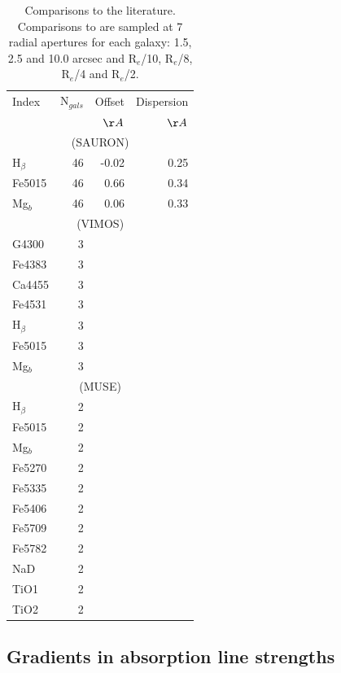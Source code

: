 	\begin{table}
		\centering
		\caption{Comparisons to the literature. Comparisons to \citet{Rampazzo2005} are sampled at 7 radial apertures for each galaxy: 1.5, 2.5 and 10.0 arcsec and R$_e$/10, R$_e$/8, R$_e$/4 and R$_e$/2.}
		\label{tab:litAbsorption}
		\begin{tabular}{l r r r}
			\hline
			\hline
			Index 		& N$_{gals}$ & Offset 	& Dispersion \\
						& 			& $\AA$		& $\AA$ \\
			\hline
			\multicolumn{4}{c}{\citet{Vazdekis2010} (SAURON)} \\
			\hline
			H$_\beta$ 	& 46		& -0.02		& 0.25	\\
			Fe5015		& 46		& 0.66		& 0.34	\\
			Mg$_b$ 		& 46		& 0.06		& 0.33	\\
			\hline
			\multicolumn{4}{c}{\citet{Rampazzo2005} (VIMOS)} \\
			\hline
			G4300 		& 3 		& 			& 	\\
			Fe4383 		& 3 		& 			& 	\\
			Ca4455 		& 3 		& 			& 	\\
			Fe4531 		& 3 		& 			& 	\\
			H$_\beta$ 	& 3 		& 			& 	\\
			Fe5015 		& 3 		& 			& 	\\
			Mg$_b$ 		& 3 		& 			& 	\\
			\hline
			\multicolumn{4}{c}{\citet{Rampazzo2005} (MUSE)} \\
			\hline
			H$_\beta$ 	& 2 		& 			& 	\\ 
			Fe5015 		& 2 		& 			& 	\\ 
			Mg$_b$ 		& 2 		& 			& 	\\
			Fe5270 		& 2 		& 			& 	\\
			Fe5335 		& 2 		& 			& 	\\
			Fe5406 		& 2 		& 			& 	\\
			Fe5709 		& 2 		& 			& 	\\
			Fe5782 		& 2 		& 			& 	\\
			NaD 		& 2 		& 			& 	\\
			TiO1 		& 2 		& 			& 	\\
			TiO2 		& 2 		& 			& 	\\
			\hline
		\end{tabular}
	\end{table}

	\subsection{Gradients in absorption line strengths}
		\label{subsec:absorptionGrad}


